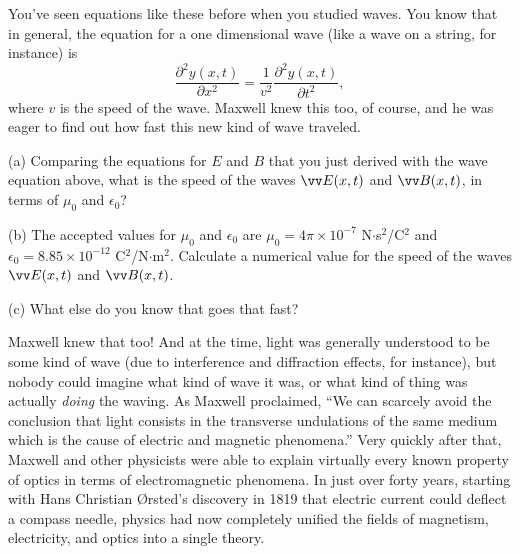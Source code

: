 You've seen equations like these before when you studied waves.  You know that in general, the equation for a one dimensional wave (like a wave on a string, for instance) is
\begin{displaymath}
\frac{\partial^2y(x,t)}{\partial x^2}= \frac{1}{v^2} \frac{\partial^2y(x,t)}{\partial t^2},
\end{displaymath}
where $v$ is the speed of the wave.  Maxwell knew this too, of course, and he was eager to find out how fast this new kind of wave traveled.

(a) Comparing the equations for $E$ and $B$ that you just derived with the wave equation above, what is the speed of the waves $\vv E(x,t)$ and $\vv B(x,t)$, in terms of $\mu_0$ and $\epsilon_0$?
\answerspace{0.5in}

(b)  The accepted values for $\mu_0$ and $\epsilon_0$ are $\mu_0=4\pi \times 10^{-7}$ N$\cdot$s$^2$/C$^2$ and 
$\epsilon_0=8.85 \times 10^{-12}$ C$^2$/N$\cdot $m$^2$.  Calculate a numerical value for the speed of the waves 
$\vv E(x,t)$ and $\vv B(x,t)$.
\answerspace{0.5in}

(c) What else do you know that goes that fast?
\answerspace{0.5in}

\pagebreak[3]
Maxwell knew that too!  And at the time, light was generally understood to be some kind of wave (due to interference and diffraction effects, for instance), but nobody could imagine what kind of wave it was, or what kind of thing was actually \textit{doing} the waving.  As Maxwell proclaimed, ``We can scarcely avoid the conclusion that light consists in the transverse undulations of the same medium which is the cause of electric and magnetic phenomena.''  Very quickly after that, Maxwell and other physicists were able to explain virtually every known property of optics in terms of electromagnetic phenomena.  In just over forty years, starting with  Hans Christian \O rsted's discovery in 1819 that electric current could deflect a compass needle, physics had now completely unified the fields of magnetism, electricity, and optics into a single theory.  





